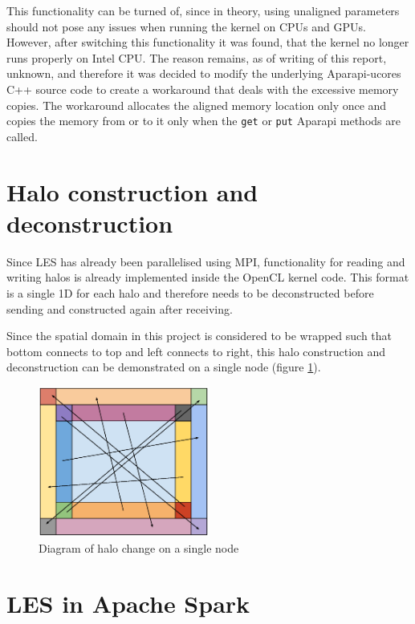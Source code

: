 \documentclass{l4proj}
\begin{document}
This functionality can be turned of, since in theory, using unaligned parameters
should not pose any issues when running the kernel on CPUs and GPUs. However,
after switching this functionality it was found, that the kernel no longer runs
properly on Intel CPU. The reason remains, as of writing of this report, unknown,
and therefore it was decided to modify the underlying Aparapi-ucores C++ source code
to create a workaround that deals with the excessive memory copies. The workaround
allocates the aligned memory location only once and copies the memory from or to it
only when the \texttt{get} or \texttt{put} Aparapi methods are called.

\section{Halo construction and deconstruction}

Since LES has already been parallelised using MPI\cite{les_mpi}, functionality 
for reading and writing halos is already implemented inside the OpenCL kernel code.
This format is a single 1D for each halo and therefore needs to be deconstructed 
before sending and constructed again after receiving. 

Since the spatial domain in this project is considered to be wrapped such that
bottom connects to top and left connects to right, this halo construction and 
deconstruction can be demonstrated on a single node (figure \ref{fig:halo_exchange}).

\begin{figure}
\centering
\includegraphics[width=0.5\textwidth]{images/Neighbour_exchange_2.eps}
\caption{Diagram of halo change on a single node}
\label{fig:halo_exchange}
\end{figure}

\section{LES in Apache Spark}
\end{document}
